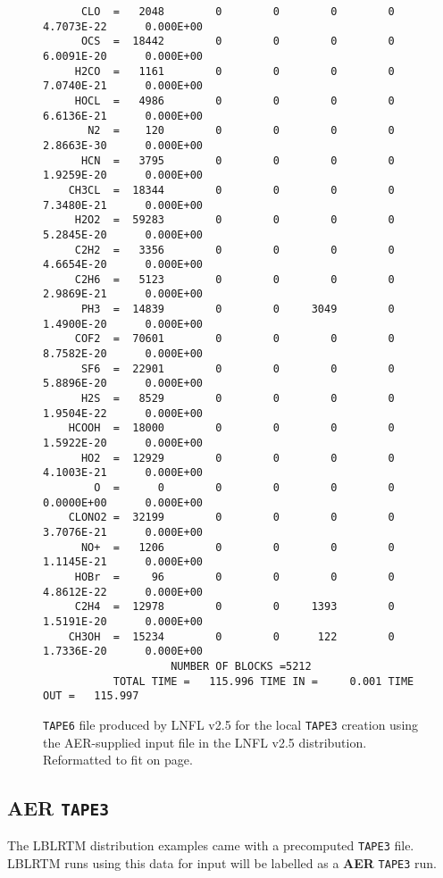\begin{figure}[htp]
{\begin{minipage}[b]{6.5in}
\begin{ttfamily}
\begin{verbatim}
      CLO  =   2048        0        0        0        0     4.7073E-22      0.000E+00
      OCS  =  18442        0        0        0        0     6.0091E-20      0.000E+00
     H2CO  =   1161        0        0        0        0     7.0740E-21      0.000E+00
     HOCL  =   4986        0        0        0        0     6.6136E-21      0.000E+00
       N2  =    120        0        0        0        0     2.8663E-30      0.000E+00
      HCN  =   3795        0        0        0        0     1.9259E-20      0.000E+00
    CH3CL  =  18344        0        0        0        0     7.3480E-21      0.000E+00
     H2O2  =  59283        0        0        0        0     5.2845E-20      0.000E+00
     C2H2  =   3356        0        0        0        0     4.6654E-20      0.000E+00
     C2H6  =   5123        0        0        0        0     2.9869E-21      0.000E+00
      PH3  =  14839        0        0     3049        0     1.4900E-20      0.000E+00
     COF2  =  70601        0        0        0        0     8.7582E-20      0.000E+00
      SF6  =  22901        0        0        0        0     5.8896E-20      0.000E+00
      H2S  =   8529        0        0        0        0     1.9504E-22      0.000E+00
    HCOOH  =  18000        0        0        0        0     1.5922E-20      0.000E+00
      HO2  =  12929        0        0        0        0     4.1003E-21      0.000E+00
        O  =      0        0        0        0        0     0.0000E+00      0.000E+00
    CLONO2 =  32199        0        0        0        0     3.7076E-21      0.000E+00
      NO+  =   1206        0        0        0        0     1.1145E-21      0.000E+00
     HOBr  =     96        0        0        0        0     4.8612E-22      0.000E+00
     C2H4  =  12978        0        0     1393        0     1.5191E-20      0.000E+00
    CH3OH  =  15234        0        0      122        0     1.7336E-20      0.000E+00
                    NUMBER OF BLOCKS =5212
           TOTAL TIME =   115.996 TIME IN =     0.001 TIME OUT =   115.997\end{verbatim}
    \end{ttfamily}
  \end{minipage}
  }
  \caption{\texttt{TAPE6} file produced by LNFL v2.5 for the local \texttt{TAPE3} creation using the AER-supplied input file in the LNFL v2.5 distribution. Reformatted to fit on page.}
  \label{fig:lnfl_ex_tape3_tape6}
\end{figure}


\subsection{AER \texttt{TAPE3}}
The LBLRTM distribution examples came with a precomputed \texttt{TAPE3} file. LBLRTM runs using this data for input will be labelled as a \textbf{AER} \texttt{TAPE3} run.

